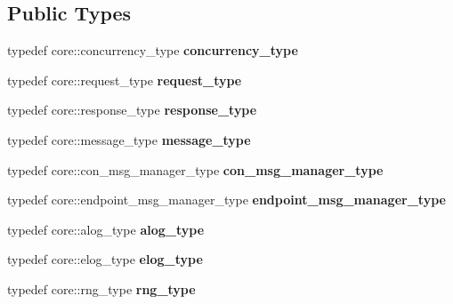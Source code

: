 \subsection*{Public Types}
\begin{DoxyCompactItemize}
\item 
\mbox{\label{structstub__config_adfbabf7bc98d14349e3aaf93ce286679}} 
typedef core\+::concurrency\+\_\+type {\bfseries concurrency\+\_\+type}
\item 
\mbox{\label{structstub__config_adf25cb289c00f17e0edde3ee14c7d513}} 
typedef core\+::request\+\_\+type {\bfseries request\+\_\+type}
\item 
\mbox{\label{structstub__config_af5bf09e5641cb374d09ca1cc57a3db68}} 
typedef core\+::response\+\_\+type {\bfseries response\+\_\+type}
\item 
\mbox{\label{structstub__config_a608dd8f08c2967a1279f862646d5ccfe}} 
typedef core\+::message\+\_\+type {\bfseries message\+\_\+type}
\item 
\mbox{\label{structstub__config_ac54fff1ce93b9e96d7c55f7a5f7070b6}} 
typedef core\+::con\+\_\+msg\+\_\+manager\+\_\+type {\bfseries con\+\_\+msg\+\_\+manager\+\_\+type}
\item 
\mbox{\label{structstub__config_a41f4e1a5902c7a558e4f06b223bff9e3}} 
typedef core\+::endpoint\+\_\+msg\+\_\+manager\+\_\+type {\bfseries endpoint\+\_\+msg\+\_\+manager\+\_\+type}
\item 
\mbox{\label{structstub__config_a0d27080bdc8a484a1c742853bcc92673}} 
typedef core\+::alog\+\_\+type {\bfseries alog\+\_\+type}
\item 
\mbox{\label{structstub__config_a48001c3d916c6e12404be8ce13e7c06d}} 
typedef core\+::elog\+\_\+type {\bfseries elog\+\_\+type}
\item 
\mbox{\label{structstub__config_ab451127820621a9c8acf60b8f8ce62b8}} 
typedef core\+::rng\+\_\+type {\bfseries rng\+\_\+type}
\item 
\mbox{\label{structstub__config_aaada21529a6fe3cb91d8621b4b6f77ff}} 

\end{DoxyCompactItemize}
